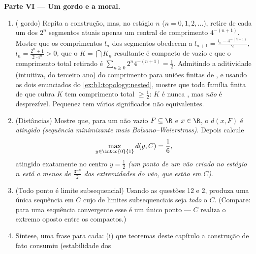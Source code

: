 \begin{problem}[{Problema de fim de semana --- o \omterm{pb:b1:topology:1}{conjunto de Cantor}
dos terços médios: comprimento zero, não enumerável, perfeito e $C + C =
\intcc{0}{2}$}]
\medskip
\noindent\textbf{Parte VI --- Um  gordo e a moral.}
\begin{enumerate}
  \item ( gordo) Repita a construção, mas, no
        estágio $n$ ($n = 0, 1, 2, \dots$), retire de cada um dos $2^n$
        segmentos atuais apenas um   central de
        comprimento $4^{-(n+1)}$. Mostre que os comprimentos $l_n$ dos
        segmentos obedecem a $l_{n+1} = \frac{l_n - 4^{-(n+1)}}{2}$, $l_n =
        \frac{2^n + 1}{2\cdot 4^n} > 0$, que o
        $K = \bigcap K_n$ resultante é compacto de  vazio e
        que o comprimento total retirado é $\sum_{n\geq0} 2^n
        4^{-(n+1)} = \frac12$. Admitindo a aditividade (intuitiva, do terceiro ano) do
        comprimento para uniões finitas de , e
        usando os dois enunciados do \cref{ex:b1:topology:nested},
        mostre que toda família finita de   que cubra
        $K$ tem comprimento total $\geq \frac12$: $K$ é nunca
        , mas \emph{não} é desprezível. Pequenez tem vários
        significados não equivalentes.
  \item (Distâncias) Mostre que, para um  não vazio $F \subseteq
        \R$ e $x \in \R$, o  $d(x, F)$ é
        \emph{atingido} \emph{(sequência minimizante mais
        Bolzano--Weierstrass)}. Depois calcule
        \[
        \max_{y \in \intcc{0}{1}} d(y, C) = \frac16 ,
        \]
        atingido exatamente no centro $y = \frac12$ \emph{(um
        ponto de um vão criado no estágio $n$ está a menos de
        $\frac{3^{-n}}{2}$ das extremidades do vão, que estão em
        $C$)}.
  \item (Todo ponto é limite subsequencial) Usando as questões 12
        e 2, produza uma única sequência em $C$ cujo  de
        limites subsequenciais seja \emph{todo} o $C$. (Compare:
        para uma sequência convergente esse  é um único ponto
        --- $C$ realiza o extremo oposto entre os compactos.)
  \item Síntese, uma frase para cada: (i) que teoremas deste
        capítulo a construção de fato consumiu (estabilidade dos

\end{enumerate}
\end{problem}
